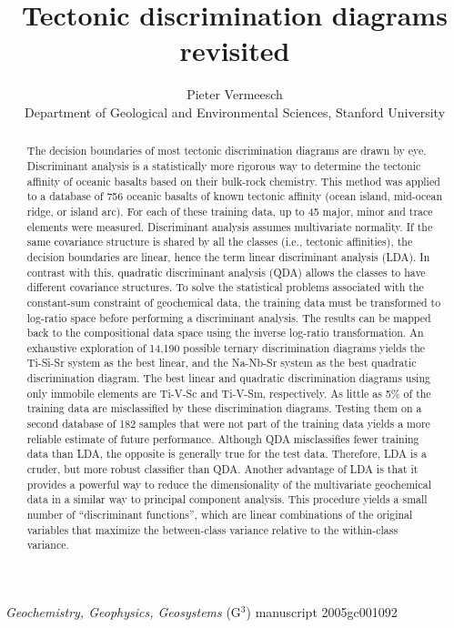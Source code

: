 \documentclass{article}
\author{Pieter Vermeesch\\
{\small Department of Geological and Environmental Sciences, 
Stanford University}}
\date{}
\title{Tectonic discrimination diagrams revisited}
\begin{document}
\onehalfspace
\maketitle

\begin{center}
{\it Geochemistry, Geophysics, Geosystems} (G$^3$) manuscript 2005gc001092
\end{center}

\begin{abstract}
The decision  boundaries of most tectonic  discrimination diagrams are
drawn by eye.  Discriminant  analysis is a statistically more rigorous
way to  determine the  tectonic affinity of  oceanic basalts  based on
their bulk-rock chemistry.   This method was applied to  a database of
756  oceanic  basalts  of   known  tectonic  affinity  (ocean  island,
mid-ocean ridge, or  island arc). For each of  these training data, up
to  45 major, minor  and trace  elements were  measured.  Discriminant
analysis  assumes  multivariate  normality.   If the  same  covariance
structure is  shared by all  the classes (i.e.,  tectonic affinities),
the decision boundaries are linear, hence the term linear discriminant
analysis  (LDA).   In   contrast  with  this,  quadratic  discriminant
analysis  (QDA)  allows  the  classes  to  have  different  covariance
structures.   To solve  the statistical  problems associated  with the
constant-sum constraint of geochemical data, the training data must be
transformed  to  log-ratio  space  before  performing  a  discriminant
analysis.  The  results can be  mapped back to the  compositional data
space  using  the  inverse  log-ratio transformation.   An  exhaustive
exploration of 14,190  possible ternary discrimination diagrams yields
the Ti-Si-Sr system as the best linear, and the Na-Nb-Sr system as the
best quadratic discrimination diagram.   The best linear and quadratic
discrimination diagrams  using only immobile elements  are Ti-V-Sc and
Ti-V-Sm,  respectively.  As  little as  5\% of  the training  data are
misclassified  by these  discrimination  diagrams. Testing  them on  a
second database of 182 samples that were not part of the training data
yields a  more reliable estimate of future  performance.  Although QDA
misclassifies fewer training data  than LDA, the opposite is generally
true for the  test data.  Therefore, LDA is a  cruder, but more robust
classifier than QDA.   Another advantage of LDA is  that it provides a
powerful  way  to  reduce   the  dimensionality  of  the  multivariate
geochemical  data in a  similar way  to principal  component analysis.
This procedure  yields a  small number of  ``discriminant functions'',
which are linear combinations  of the original variables that maximize
the between-class variance relative to the within-class variance.
\end{abstract}
\end{document}
